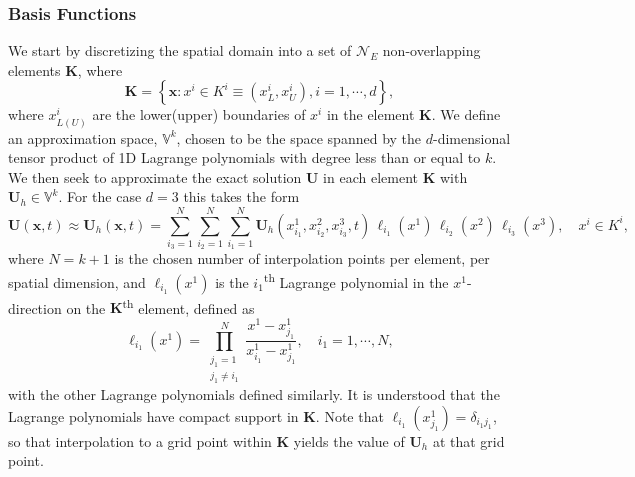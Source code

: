\documentclass[letterpaper]{jpconf}
\renewcommand{\bs}[1]{\boldsymbol{#1}}
\newcommand{\mc}[1]{\mathcal{#1}}
\begin{document}
 \subsubsection{Basis Functions}
 We start by discretizing the spatial domain into a set of $\mc{N}_{E}$ non-overlapping elements $\bs{K}$, where
 \begin{equation}
     \bs{K}=\left\{\bs{x}:x^{i}\in K^{i}\equiv\left(x^{i}_{L},x^{i}_{U}\right),i=1,\cdots,d\right\},
 \end{equation}
 where $x^{i}_{L(U)}$ are the lower(upper) boundaries of $x^{i}$ in the element $\bs{K}$. We define an approximation space, $\mathbb{V}^{k}$, chosen to be the space spanned by the $d$-dimensional tensor product of 1D Lagrange polynomials with degree less than or equal to $k$. We then seek to approximate the exact solution $\bs{U}$ in each element $\bs{K}$ with $\bs{U}_{h}\in\mathbb{V}^{k}$.
 For the case $d=3$ this takes the form
 \begin{equation}\label{Eq:ApproxSolution}
     \bs{U}\left(\bs{x},t\right)\approx\bs{U}_{h}\left(\bs{x},t\right)=\sum\limits_{i_{3}=1}^{N}\sum\limits_{i_{2}=1}^{N}\sum\limits_{i_{1}=1}^{N}\bs{U}_{h}\left(x^{1}_{i_{1}},x^{2}_{i_{2}},x^{3}_{i_{3}},t\right)\,\ell_{i_{1}}\left(x^{1}\right)\,\ell_{i_{2}}\left(x^{2}\right)\,\ell_{i_{3}}\left(x^{3}\right),\hspace{1em}x^{i}\in K^{i},
 \end{equation}
 where $N=k+1$ is the chosen number of interpolation points per element, per spatial dimension, and $\ell_{i_{1}}\left(x^{1}\right)$ is the $i_{1}$\textsuperscript{th} Lagrange polynomial in the $x^{1}$-direction on the $\bs{K}$\textsuperscript{th} element, defined as
 \begin{equation}
     \ell_{i_{1}}\left(x^{1}\right)=\prod\limits_{\substack{j_{1}=1 \\ j_{1}\neq i_{1}}}^{N}\frac{x^{1}-x^{1}_{j_{1}}}{x^{1}_{i_{1}}-x^{1}_{j_{1}}},\hspace{1em}i_{1}=1,\cdots,N,
 \end{equation}
 with the other Lagrange polynomials defined similarly. It is understood that the Lagrange polynomials have compact support in $\bs{K}$. Note that $\ell_{i_{1}}\left(x^{1}_{j_{1}}\right)=\delta_{i_{1}j_{1}}$, so that interpolation to a grid point within $\bs{K}$ yields the value of $\bs{U}_{h}$ at that grid point.
\end{document}
